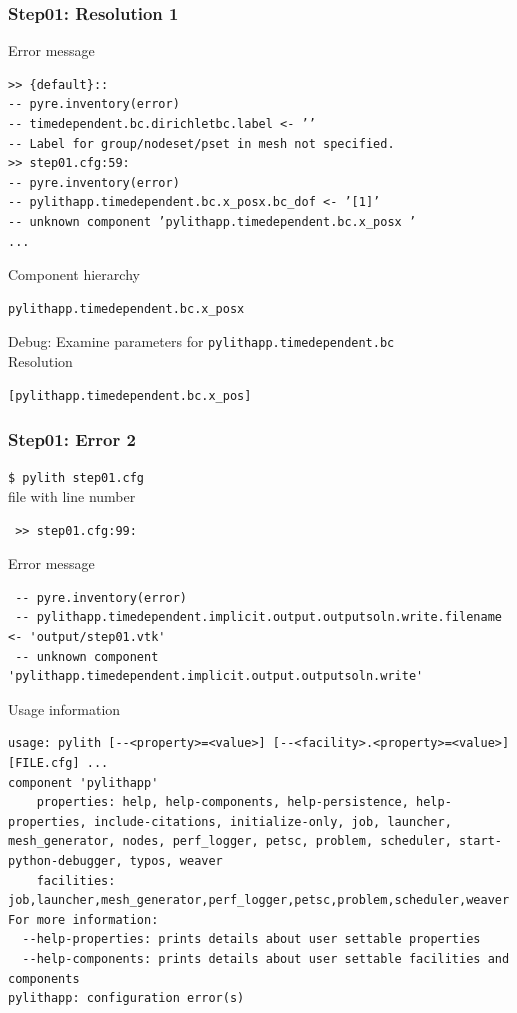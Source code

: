\documentclass[aspectration=169]{beamer}
\newcommand{\cmd}[1]{{\footnotesize\tt \color{ltred}#1}}
\newcommand{\errlabel}[1]{{\small \color{blue}#1}}
\newcommand{\debuginfo}[1]{{\small \color{green}#1}}
\begin{document}
\begin{frame}[fragile]
  \frametitle{Step01: Resolution 1}

\errlabel{Error message}
\begin{lstlisting}
>> {default}::
-- pyre.inventory(error)
-- timedependent.bc.dirichletbc.label <- ’’
-- Label for group/nodeset/pset in mesh not specified.
>> step01.cfg:59:
-- pyre.inventory(error)
-- pylithapp.timedependent.bc.x_posx.bc_dof <- ’[1]’
-- unknown component ’pylithapp.timedependent.bc.x_posx ’
...
\end{lstlisting}
\errlabel{Component hierarchy}
\begin{lstlisting}
pylithapp.timedependent.bc.x_posx
\end{lstlisting}\pause
\errlabel{Debug:} \debuginfo{Examine parameters for {\tt pylithapp.timedependent.bc}}\pause\\
\errlabel{Resolution}
\begin{lstlisting}
[pylithapp.timedependent.bc.x_pos]
\end{lstlisting}


\end{frame}


\begin{frame}[fragile]
  \frametitle{Step01: Error 2}

\cmd{\$ pylith step01.cfg}\\
\errlabel{{\tt .cfg} file with line number}
\begin{lstlisting}
 >> step01.cfg:99:
\end{lstlisting}
\errlabel{Error message}
\begin{lstlisting}
 -- pyre.inventory(error)
 -- pylithapp.timedependent.implicit.output.outputsoln.write.filename <- 'output/step01.vtk'
 -- unknown component 'pylithapp.timedependent.implicit.output.outputsoln.write'
\end{lstlisting}
\errlabel{Usage information}
\begin{lstlisting}
usage: pylith [--<property>=<value>] [--<facility>.<property>=<value>] [FILE.cfg] ...
component 'pylithapp'
    properties: help, help-components, help-persistence, help-properties, include-citations, initialize-only, job, launcher, mesh_generator, nodes, perf_logger, petsc, problem, scheduler, start-python-debugger, typos, weaver
    facilities: job,launcher,mesh_generator,perf_logger,petsc,problem,scheduler,weaver
For more information:
  --help-properties: prints details about user settable properties
  --help-components: prints details about user settable facilities and components
pylithapp: configuration error(s)
\end{lstlisting}
  
\end{frame}
\end{document}
